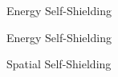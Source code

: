 \documentclass[sans,mathserif,aspectratio=169, 10pt]{beamer}
\begin{document}
\begin{frame}{Energy Self-Shielding}
  \centering
\end{frame}

\begin{frame}{Energy Self-Shielding}
  \centering
\end{frame}

\begin{frame}{Spatial Self-Shielding}
  \centering
\end{frame}
\end{document}
